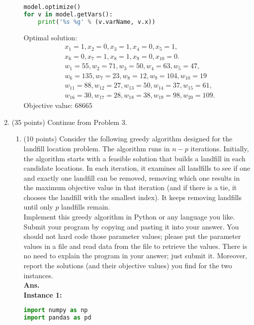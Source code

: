 \documentclass[12pt]{article}
\begin{document}
\begin{enumerate}
\begin{enumerate}
\begin{lstlisting}[language=Python]
model.optimize()
for v in model.getVars():
    print('%s %g' % (v.varName, v.x))
                        \end{lstlisting}
                        Optimal solution:
                        \begin{align*}
                               & x_1 = 1, x_2 = 0, x_3 = 1, x_4 = 0, x_5 = 1,                      \\
                               & x_6 = 0, x_7 = 1, x_8 = 1, x_9 = 0, x_{10} = 0.                   \\
                               & w_1 = 55, w_2 = 71, w_3 = 50, w_4 = 63, w_5 = 47,                 \\
                               & w_6 = 135, w_7 = 23, w_8 = 12, w_9 = 104, w_{10} = 19             \\
                               & w_{11} = 88, w_{12} = 27, w_{13} = 50, w_{14} = 37, w_{15} = 61,  \\
                               & w_{16} = 30, w_{17} = 28, w_{18} = 38, w_{19} = 98, w_{20} = 109.
                        \end{align*}
                        Objective value:  $68665$
            \end{enumerate}
      \item (35 points) Continue from Problem 3.
            \begin{enumerate}
                  \item (10 points) Consider the following greedy algorithm designed for the landfill location problem. The algorithm runs in $n - p$ iterations. Initially, the algorithm starts with a feasible solution that builds a landfill in each candidate locations. In each iteration, it examines all landfills to see if one and exactly one landfill can be removed, removing which one results in the maximum objective value in that iteration (and if there is a tie, it chooses the landfill with the smallest index). It keeps removing landfills until only $p$ landfills remain.\\
                        Implement this greedy algorithm in Python or any language you like. Submit your program by copying and pasting it into your answer. You should not hard code those parameter values; please put the parameter values in a file and read data from the file to retrieve the values. There is no need to explain the program in your answer; just submit it. Moreover, report the solutions (and their objective values) you find for the two instances.\\
                        \textbf{Ans.}\\
                        \textbf{Instance 1:}
                        \begin{lstlisting}[language=Python]
import numpy as np
import pandas as pd


\end{lstlisting}
\end{enumerate}
\end{enumerate}
\end{document}
